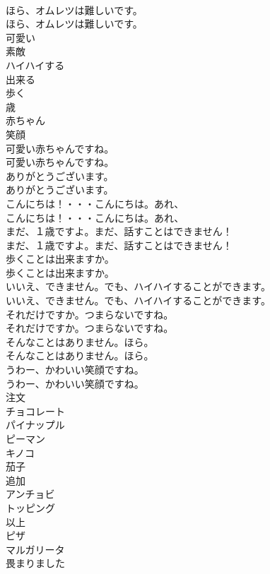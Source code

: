 \documentclass[8pt]{extreport}
\begin{document}
\begin{CJK}{UTF8}{min}
\\	ほら、オムレツは難しいです。	
\\	ほら、オムレツは難しいです。 
\\	可愛い
\\	素敵
\\	ハイハイする
\\	出来る
\\	歩く
\\	歳
\\	赤ちゃん
\\	笑顔
\\	可愛い赤ちゃんですね。	
\\	可愛い赤ちゃんですね。 
\\	ありがとうございます。	
\\	ありがとうございます。 
\\	こんにちは！・・・こんにちは。あれ、	
\\	こんにちは！・・・こんにちは。あれ、 
\\	まだ、１歳ですよ。まだ、話すことはできません！	
\\	まだ、１歳ですよ。まだ、話すことはできません！ 
\\	歩くことは出来ますか。	
\\	歩くことは出来ますか。 
\\	いいえ、できません。でも、ハイハイすることができます。	
\\	いいえ、できません。でも、ハイハイすることができます。 
\\	それだけですか。つまらないですね。	
\\	それだけですか。つまらないですね。 
\\	そんなことはありません。ほら。	
\\	そんなことはありません。ほら。 
\\	うわー、かわいい笑顔ですね。	
\\	うわー、かわいい笑顔ですね。 
\\	注文
\\	チョコレート
\\	パイナップル
\\	ピーマン
\\	キノコ
\\	茄子
\\	追加
\\	アンチョビ
\\	トッピング
\\	以上
\\	ピザ
\\	マルガリータ
\\	畏まりました

\end{CJK}
\end{document}
